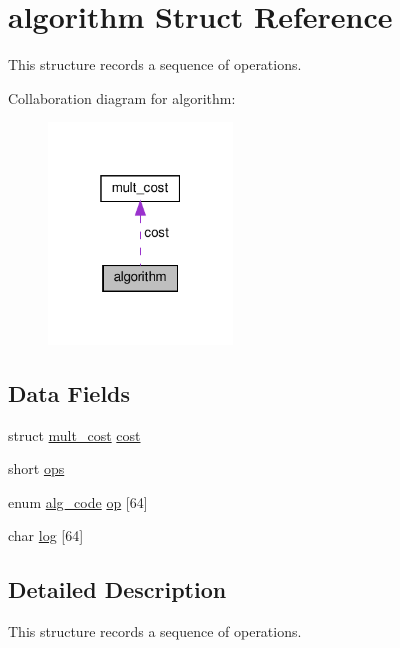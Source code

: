 \hypertarget{structalgorithm}{}\section{algorithm Struct Reference}
\label{structalgorithm}


This structure records a sequence of operations.  




Collaboration diagram for algorithm\+:
\nopagebreak
\begin{figure}[H]
\begin{center}
\leavevmode
\includegraphics[width=139pt]{d1/d06/structalgorithm__coll__graph}
\end{center}
\end{figure}
\subsection*{Data Fields}
\begin{DoxyCompactItemize}
\item 
struct \hyperlink{structmult__cost}{mult\+\_\+cost} \hyperlink{structalgorithm_a66dd89ea547e18bf2948b01d102fa2ba}{cost}
\item 
short \hyperlink{structalgorithm_a2ad8f16e1aa5d2ab270a40ba50320fe5}{ops}
\item 
enum \hyperlink{IR__lowering_8cpp_aaf531dce3659d448e57b2c73d1c415c4}{alg\+\_\+code} \hyperlink{structalgorithm_a40a99025611a19da97892bf8cba574b1}{op} \mbox{[}64\mbox{]}
\item 
char \hyperlink{structalgorithm_a0f40f44d4dac45fe39056b9ee3ace7af}{log} \mbox{[}64\mbox{]}
\end{DoxyCompactItemize}


\subsection{Detailed Description}
This structure records a sequence of operations. 

